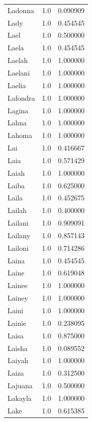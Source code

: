 \documentclass[
  letterpaper,
  DIV=11,
  numbers=noendperiod]{scrreprt}
\begin{document}
\begin{tabular}{lrr}
Ladonna         &   1.0 &   0.090909 \\
Lady            &   1.0 &   0.454545 \\
Lael            &   1.0 &   0.500000 \\
Laela           &   1.0 &   0.454545 \\
Laelah          &   1.0 &   1.000000 \\
Laelani         &   1.0 &   1.000000 \\
Laelia          &   1.0 &   1.000000 \\
Lafondra        &   1.0 &   1.000000 \\
Lagina          &   1.0 &   1.000000 \\
Lahna           &   1.0 &   1.000000 \\
Lahoma          &   1.0 &   1.000000 \\
Lai             &   1.0 &   0.416667 \\
Laia            &   1.0 &   0.571429 \\
Laiah           &   1.0 &   1.000000 \\
Laiba           &   1.0 &   0.625000 \\
Laila           &   1.0 &   0.452675 \\
Lailah          &   1.0 &   0.400000 \\
Lailani         &   1.0 &   0.909091 \\
Lailany         &   1.0 &   0.857143 \\
Lailoni         &   1.0 &   0.714286 \\
Laina           &   1.0 &   0.454545 \\
Laine           &   1.0 &   0.619048 \\
Lainee          &   1.0 &   1.000000 \\
Lainey          &   1.0 &   1.000000 \\
Laini           &   1.0 &   1.000000 \\
Lainie          &   1.0 &   0.238095 \\
Laisa           &   1.0 &   0.875000 \\
Laisha          &   1.0 &   0.089552 \\
Laiyah          &   1.0 &   1.000000 \\
Laiza           &   1.0 &   0.312500 \\
Lajuana         &   1.0 &   0.500000 \\
Lakayla         &   1.0 &   1.000000 \\
Lake            &   1.0 &   0.615385 \\

\end{tabular}
\end{document}
